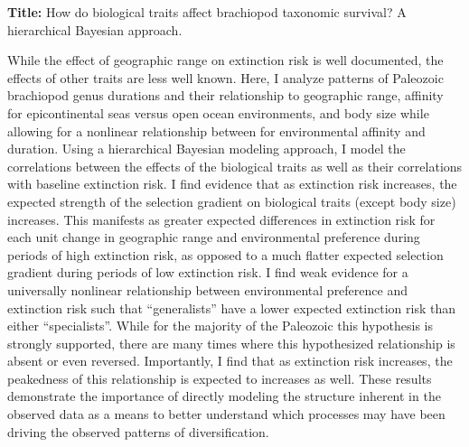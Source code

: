 \documentclass[12pt,letterpaper]{article}
\begin{document}
\textbf{Title:} How do biological traits affect brachiopod taxonomic survival? A hierarchical Bayesian approach.

While the effect of geographic range on extinction risk is well documented, the effects of other traits are less well known. Here, I analyze patterns of Paleozoic brachiopod genus durations and their relationship to geographic range, affinity for epicontinental seas versus open ocean environments, and body size while allowing for a nonlinear relationship between for environmental affinity and duration. Using a hierarchical Bayesian modeling approach, I model the correlations between the effects of the biological traits as well as their correlations with baseline extinction risk. I find evidence that as extinction risk increases, the expected strength of the selection gradient on biological traits (except body size) increases. This manifests as greater expected differences in extinction risk for each unit change in geographic range and environmental preference during periods of high extinction risk, as opposed to a much flatter expected selection gradient during periods of low extinction risk. I find weak evidence for a universally nonlinear relationship between environmental preference and extinction risk such that ``generalists'' have a lower expected extinction risk than either ``specialists''. While for the majority of the Paleozoic this hypothesis is strongly supported, there are many times where this hypothesized relationship is absent or even reversed. Importantly, I find that as extinction risk increases, the peakedness of this relationship is expected to increases as well. These results demonstrate the importance of directly modeling the structure inherent in the observed data as a means to better understand which processes may have been driving the observed patterns of diversification.
\end{document}
